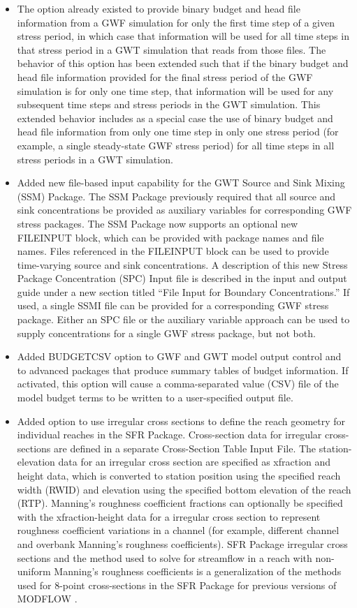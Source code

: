 \documentclass[11pt,twoside,twocolumn]{usgsreport}
\begin{document}
\begin{itemize}
\begin{itemize}
	        \item The option already existed to provide binary budget and head file information from a GWF simulation for only the first time step of a given stress period, in which case that information will be used for all time steps in that stress period in a GWT simulation that reads from those files. The behavior of this option has been extended such that if the binary budget and head file information provided for the final stress period of the GWF simulation is for only one time step, that information will be used for any subsequent time steps and stress periods in the GWT simulation. This extended behavior includes as a special case the use of binary budget and head file information from only one time step in only one stress period (for example, a single steady-state GWF stress period) for all time steps in all stress periods in a GWT simulation.
	        \item Added new file-based input capability for the GWT Source and Sink Mixing (SSM) Package.  The SSM Package previously required that all source and sink concentrations be provided as auxiliary variables for corresponding GWF stress packages.  The SSM Package now supports an optional new FILEINPUT block, which can be provided with package names and file names.  Files referenced in the FILEINPUT block can be used to provide time-varying source and sink concentrations.  A description of this new Stress Package Concentration (SPC) Input file is described in the input and output guide under a new section titled ``File Input for Boundary Concentrations.''  If used, a single SSMI file can be provided for a corresponding GWF stress package.  Either an SPC file or the auxiliary variable approach can be used to supply concentrations for a single GWF stress package, but not both.
	        \item Added BUDGETCSV option to GWF and GWT model output control and to advanced packages that produce summary tables of budget information.  If activated, this option will cause a comma-separated value (CSV) file of the model budget terms to be written to a user-specified output file.
	        \item Added option to use irregular cross sections to define the reach geometry for individual reaches in the SFR Package. Cross-section data for irregular cross-sections are defined in a separate Cross-Section Table Input File. The station-elevation data for an irregular cross section are specified as xfraction and height data, which is converted to station position using the specified reach width (RWID) and elevation using the specified bottom elevation of the reach (RTP). Manning's roughness coefficient fractions can optionally be specified with the xfraction-height data for a irregular cross section to represent roughness coefficient variations in a channel (for example, different channel and overbank Manning's roughness coefficients). SFR Package irregular cross sections and the method used to solve for streamflow in a reach with non-uniform Manning's roughness coefficients is a generalization of the methods used for 8-point cross-sections in the SFR Package for previous versions of MODFLOW \citep{modflowsfr1pack}. 

\end{itemize}
\end{itemize}
\end{document}
